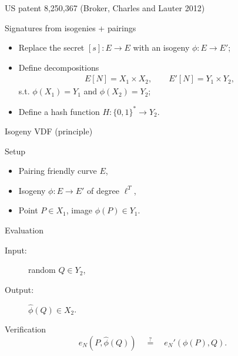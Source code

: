 \documentclass[aspectratio=169]{beamer}
\newcommand{\F}{\mathbb{F}}
\begin{document}

\begin{frame}{US patent 8,250,367 (Broker, Charles and Lauter 2012)}
  \begin{block}{Signatures from isogenies + pairings}
    \begin{itemize}
    \item Replace the secret \emph{$[s]:E\to E$} with an isogeny \emph{$\phi:E\to E'$};
    \item Define decompositions
      \begin{align*}
        E[N] = X_1 \times X_2, \qquad E'[N] = Y_1 \times Y_2,
      \end{align*}
      s.t. \emph{$\phi(X_1) = Y_1$} and \emph{$\phi(X_2) = Y_2$};
    \item Define a hash function \emph{$H:\{0,1\}^*\to Y_2$}.
    \end{itemize}
  \end{block}
  
  \centering
\end{frame}


\begin{frame}{Isogeny VDF {\small (principle)}}
  \begin{block}{Setup}
    \begin{itemize}
    \item Pairing friendly curve \emph{$E$},
    \item Isogeny \emph{$\phi:E\to E'$} of degree \emph{$\ell^T$},
    \item Point \emph{$P\in X_1$}, image \emph{$\phi(P) \in Y_1$}.
    \end{itemize}
  \end{block}

  \begin{block}{Evaluation}
    \begin{description}
    \item[Input:] random \emph{$Q\in Y_2$},
    \item[Output:] \emph{$\hat\phi(Q) \in X_2$}.
    \end{description}
  \end{block}

  \begin{block}{Verification}
    \large
    \[e_N(P,\hat\phi(Q)) \quad\overset{?}{=}\quad e_N'(\phi(P),Q).\]
  \end{block}
\end{frame}
\end{document}
